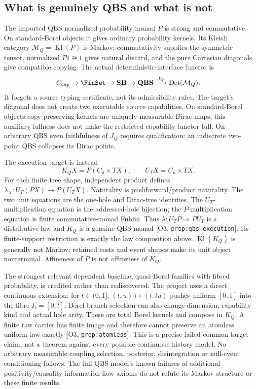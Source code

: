 \documentclass[11pt,a4paper]{article}
\theoremstyle{definition}
\newcommand{\QBS}{\mathbf{QBS}}
\newcommand{\Addr}[2]{\textup{[#1, \texttt{#2}]}}
\begin{document}
\subsection{What is genuinely QBS and what is not}
The imported QBS normalized probability monad \(P\) is strong and
commutative. On standard-Borel objects it gives ordinary probability
kernels. Its Kleisli category \(\mathcal M_Q=\operatorname{Kl}(P)\)
is Markov: commutativity supplies the symmetric tensor, normalized
\(P1\cong1\) gives natural discard, and the pure Cartesian diagonals
give compatible copying. The actual deterministic-interface functor is
\[
 C_{\rm cap}\to\FinSet\to\mathbf{SB}\to\QBS
                    \xrightarrow{J_Q}\operatorname{Det}(\mathcal M_Q).
\]
It forgets a source typing certificate, not its admissibility rules. The
target's diagonal does not create two executable source capabilities.
On standard-Borel objects copy-preserving kernels are uniquely measurable
Dirac maps; this auxiliary fullness does not make the restricted capability
functor full. On arbitrary QBS even faithfulness of \(J_Q\) requires
qualification: an indiscrete two-point QBS collapses its Dirac points.

The execution target is instead
\[
 K_QX=P(C_d\times TX),\qquad U_TX=C_d\times TX.
\]
For each finite tree shape, independent product defines
\(\lambda_X:U_T(PX)\to P(U_TX)\). Naturality is pushforward/product
naturality. The two unit equations are the one-hole and Dirac-tree
identities. The \(U_T\)-multiplication equation is the addressed-hole
bijection; the \(P\)-multiplication equation is finite commutative-monad
Fubini. Thus \(\lambda:U_TP\Rightarrow PU_T\) is a distributive law
and \(K_Q\) is a genuine QBS monad \Addr{O3}{prop:qbs-execution}.
Its finite-support restriction is exactly the law composition above.
\(\operatorname{Kl}(K_Q)\) is generally not Markov: retained costs and
event shapes make its unit object nonterminal. Affineness of \(P\) is
not affineness of \(K_Q\).

The strongest relevant dependent baseline, quasi-Borel families with
fibred probability, is credited rather than rediscovered. The project
uses a direct continuous extension: for \(t\in(0,1]\),
\((t,u)\mapsto(t,tu)\) pushes uniform \([0,1]\) into the fibre
\(I_t=[0,t]\). Borel branch selection can also change dimension,
capability kind and actual hole arity. These are total Borel kernels and
compose in \(K_Q\). A finite raw carrier has finite image and therefore
cannot preserve an atomless uniform law exactly
\Addr{O3}{prop:atomless}. This is a precise failed common-target claim,
not a theorem against every possible continuous history model.
No arbitrary measurable coupling selection, posterior, disintegration or
null-event conditioning follows. The full QBS model's known failures of
additional positivity/causality information-flow axioms do not refute its
Markov structure or these finite results.
\end{document}
